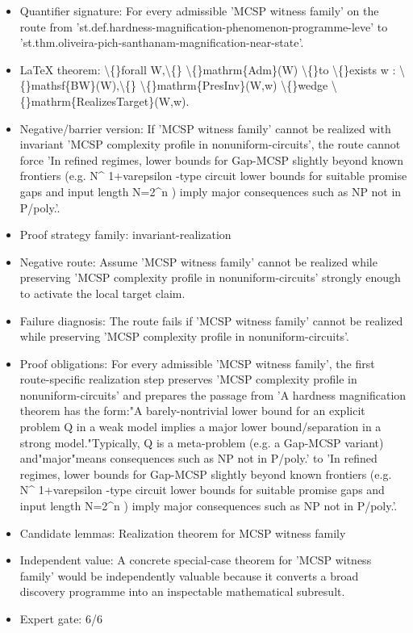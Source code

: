 \documentclass[11pt]{article}
\begin{document}
\begin{itemize}
\item Quantifier signature: For every admissible 'MCSP witness family' on the route from 'st.def.hardness-magnification-phenomenon-programme-leve' to 'st.thm.oliveira-pich-santhanam-magnification-near-state'.
\item LaTeX theorem: \textbackslash\{\}forall W,\textbackslash\{\} \textbackslash\{\}mathrm\{Adm\}(W) \textbackslash\{\}to \textbackslash\{\}exists w : \textbackslash\{\}mathsf\{BW\}(W),\textbackslash\{\} \textbackslash\{\}mathrm\{PresInv\}(W,w) \textbackslash\{\}wedge \textbackslash\{\}mathrm\{RealizesTarget\}(W,w).
\item Negative/barrier version: If 'MCSP witness family' cannot be realized with invariant 'MCSP complexity profile in nonuniform-circuits', the route cannot force 'In refined regimes, lower bounds for Gap-MCSP slightly beyond known frontiers (e.g. N\textasciicircum{} 1+varepsilon -type circuit lower bounds for suitable promise gaps and input length N=2\textasciicircum{}n ) imply major consequences such as NP not in P/poly.'.
\item Proof strategy family: invariant-realization
\item Negative route: Assume 'MCSP witness family' cannot be realized while preserving 'MCSP complexity profile in nonuniform-circuits' strongly enough to activate the local target claim.
\item Failure diagnosis: The route fails if 'MCSP witness family' cannot be realized while preserving 'MCSP complexity profile in nonuniform-circuits'.
\item Proof obligations: For every admissible 'MCSP witness family', the first route-specific realization step preserves 'MCSP complexity profile in nonuniform-circuits' and prepares the passage from 'A hardness magnification theorem has the form:"A barely-nontrivial lower bound for an explicit problem Q in a weak model implies a major lower bound/separation in a strong model."Typically, Q is a meta-problem (e.g. a Gap-MCSP variant) and"major"means consequences such as NP not in P/poly.' to 'In refined regimes, lower bounds for Gap-MCSP slightly beyond known frontiers (e.g. N\textasciicircum{} 1+varepsilon -type circuit lower bounds for suitable promise gaps and input length N=2\textasciicircum{}n ) imply major consequences such as NP not in P/poly.'.
\item Candidate lemmas: Realization theorem for MCSP witness family
\item Independent value: A concrete special-case theorem for 'MCSP witness family' would be independently valuable because it converts a broad discovery programme into an inspectable mathematical subresult.
\item Expert gate: 6/6
\end{itemize}
\end{document}
